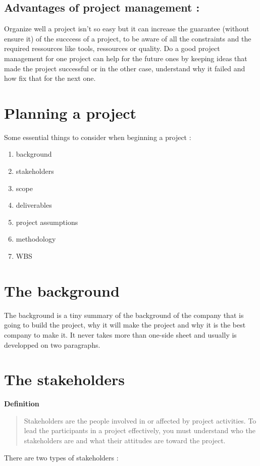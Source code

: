 \documentclass{article}
\begin{document}
\subsection{Advantages of project management :}
Organize well a project isn't so easy but it can increase the guarantee (without ensure it) of the succcess of a project, to be aware of all the constraints and the required ressources like tools, ressources or quality. Do a good project management for one project can help for the future ones by keeping ideas that made the project successful or in the other case, understand why it failed and how fix that for the next one.


\newpage
\section{Planning a project}
Some essential things to consider when beginning a project :
\begin{enumerate}
    \item background
    \item stakeholders
    \item scope
    \item deliverables
    \item project assumptions
    \item methodology
    \item WBS
\end{enumerate}

\section{The background}
The background is a tiny summary of the background of the company that is going to build the project, why it will make the project and why it is the best company to make it. It never takes more than one-side sheet and usually is developped on two paragraphs.


\newpage
\section{The stakeholders}
\textbf{Definition}
\begin{quote}
	Stakeholders are the people involved in or affected by project activities. To lead the participants in a project effectively, you must understand who the stakeholders are and what their attitudes are toward the project.
\end{quote}


There are two types of stakeholders :
\end{document}
